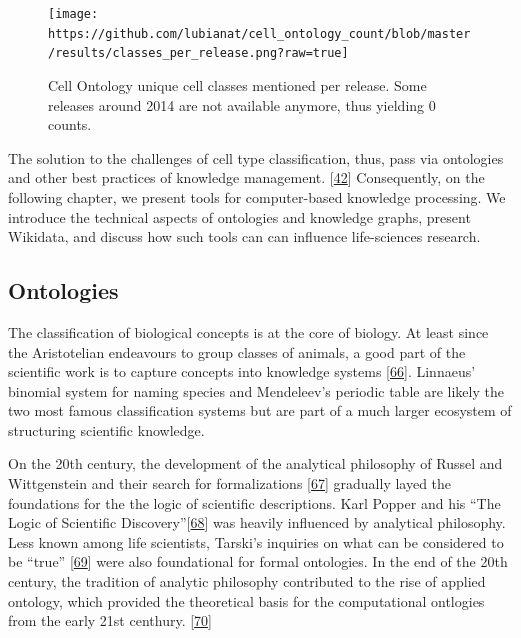\begin{figure}
\hypertarget{fig:cl_counts}{%
\centering
\texttt{[image: https://github.com/lubianat/cell\_ontology\_count/blob/master/results/classes\_per\_release.png?raw=true]}
\caption{Cell Ontology unique cell classes mentioned per release. Some releases around 2014 are not available anymore, thus yielding 0 counts.}\label{fig:cl_counts}
}
\end{figure}

The solution to the challenges of cell type classification, thus, pass via ontologies and other best practices of knowledge management. {[}\protect\hyperlink{ref-qT8WxqjA}{42}{]}
Consequently, on the following chapter, we present tools for computer-based knowledge processing.
We introduce the technical aspects of ontologies and knowledge graphs, present Wikidata, and discuss how such tools can can influence life-sciences research.

\hypertarget{ontologies}{%
\subsection{Ontologies}\label{ontologies}}

The classification of biological concepts is at the core of biology. At least since the Aristotelian endeavours to group classes of animals, a good part of the scientific work is to capture concepts into knowledge systems {[}\protect\hyperlink{ref-DLTMbf54}{66}{]}.
Linnaeus' binomial system for naming species and Mendeleev's periodic table are likely the two most famous classification systems but are part of a much larger ecosystem of structuring scientific knowledge.

On the 20th century, the development of the analytical philosophy of Russel and Wittgenstein and their search for formalizations {[}\protect\hyperlink{ref-cZEmYsqx}{67}{]} gradually layed the foundations for the the logic of scientific descriptions.
Karl Popper and his ``The Logic of Scientific Discovery''{[}\protect\hyperlink{ref-to2onCDy}{68}{]} was heavily influenced by analytical philosophy.
Less known among life scientists, Tarski's inquiries on what can be considered to be ``true'' {[}\protect\hyperlink{ref-RghcuiSS}{69}{]} were also foundational for formal ontologies.
In the end of the 20th century, the tradition of analytic philosophy contributed to the rise of applied ontology, which provided the theoretical basis for the computational ontlogies from the early 21st centhury. {[}\protect\hyperlink{ref-35incsRu}{70}{]}

